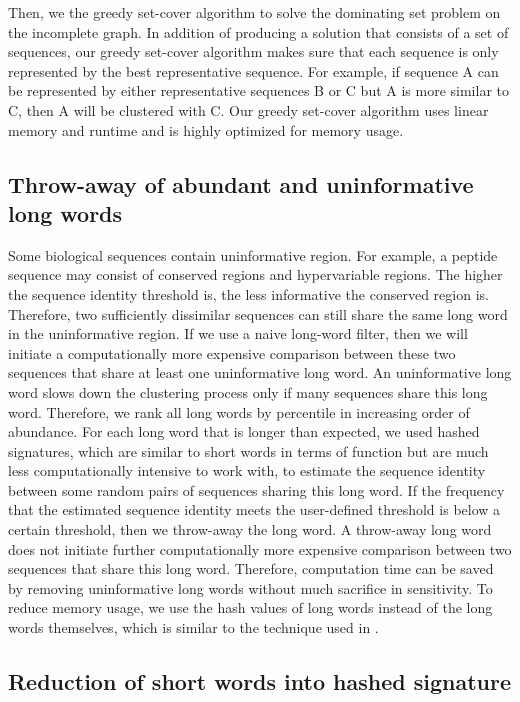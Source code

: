 \documentclass[]{article}
\begin{document}
Then, we the greedy set-cover algorithm to solve the dominating set problem on the incomplete graph.
In addition of producing a solution that consists of a set of sequences, 
our greedy set-cover algorithm makes sure that each sequence is only represented by the best representative sequence.
For example, if sequence A can be represented by either representative sequences B or C but A is more similar to C,
then A will be clustered with C.  
Our greedy set-cover algorithm uses linear memory and runtime and is highly optimized for memory usage.


\subsection{Throw-away of abundant and uninformative long words}

Some biological sequences contain uninformative region.
For example, a peptide sequence may consist of conserved regions and hypervariable regions.
The higher the sequence identity threshold is, the less informative the conserved region is.
Therefore, two sufficiently dissimilar sequences can still share the same long word in the uninformative region.
If we use a naive long-word filter, then we will initiate a computationally more expensive comparison between these two sequences that share at least one uninformative long word.
An uninformative long word slows down the clustering process only if many sequences share this long word.
Therefore, we rank all long words by percentile in increasing order of abundance.
For each long word that is longer than expected, we used hashed signatures, which are similar to short words in terms of function but are much less computationally intensive to work with, to estimate the sequence identity between some random pairs of sequences sharing this long word.
If the frequency that the estimated sequence identity meets the user-defined threshold is below a certain threshold,
then we throw-away the long word.
A throw-away long word does not initiate further computationally more expensive comparison between two sequences that share this long word.
Therefore, computation time can be saved by removing uninformative long words without much sacrifice in sensitivity.
To reduce memory usage, we use the hash values of long words instead of the long words themselves, which is similar to the technique used in \cite{steinegger2017linclust}.

\subsection{Reduction of short words into hashed signature}
\end{document}
